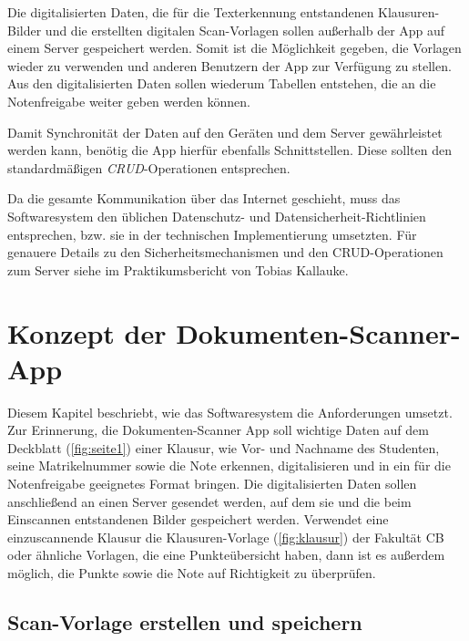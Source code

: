 \documentclass[notables, nomenclature, oneside, 150]{HSMW-Thesis}
\begin{document}
	Die digitalisierten Daten, die für die Texterkennung entstandenen Klausuren-Bilder und die erstellten digitalen Scan-Vorlagen sollen außerhalb der App auf einem Server gespeichert werden. Somit ist die Möglichkeit gegeben, die  Vorlagen wieder zu verwenden und anderen Benutzern der App zur Verfügung zu stellen. Aus den digitalisierten Daten sollen wiederum Tabellen entstehen, die an die Notenfreigabe weiter geben werden können.
	
	Damit Synchronität der Daten auf den Geräten und dem Server gewährleistet werden kann, benötig die App hierfür ebenfalls Schnittstellen. Diese sollten den standardmäßigen \textit{CRUD}-Operationen entsprechen. 
	
	Da die gesamte Kommunikation über das Internet geschieht, muss das Softwaresystem den üblichen Datenschutz- und Datensicherheit-Richtlinien entsprechen, bzw. sie in der technischen Implementierung umsetzten. Für genauere Details zu den Sicherheitsmechanismen und den CRUD-Operationen zum Server siehe im Praktikumsbericht von Tobias Kallauke. 


\chapter{Konzept der Dokumenten-Scanner-App}\label{ch:konzept}
	Diesem Kapitel beschriebt, wie das Softwaresystem die Anforderungen umsetzt. Zur Erinnerung, die Dokumenten-Scanner App soll wichtige Daten auf dem Deckblatt (\ref{fig:seite1}) einer Klausur, wie Vor- und Nachname des Studenten, seine Matrikelnummer sowie die Note erkennen, digitalisieren und in ein für die Notenfreigabe geeignetes Format bringen. Die digitalisierten Daten sollen anschließend an einen Server gesendet werden, auf dem sie und die beim Einscannen entstandenen Bilder gespeichert werden. Verwendet eine einzuscannende Klausur die Klausuren-Vorlage (\ref{fig:klausur}) der Fakultät CB oder ähnliche Vorlagen, die eine Punkteübersicht haben, dann ist es außerdem möglich, die Punkte sowie die Note auf Richtigkeit zu überprüfen. 
	
	\section{Scan-Vorlage erstellen und speichern}
	
\end{document}
